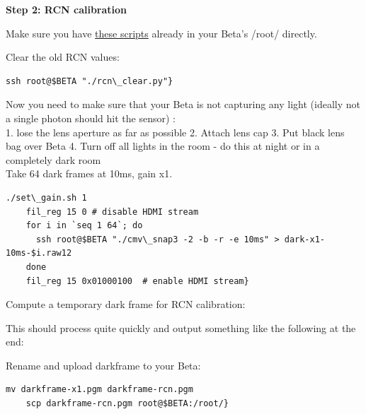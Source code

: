 {   


\textbf{Step 2: RCN calibration }

Make sure you have \href{https://github.com/apertus-open-source-cinema/beta-software/tree/master/beta-scripts}{these scripts} already in your Beta's /root/ directly.

Clear the old RCN values: 

\begin{lstlisting}[breaklines=true, breakatwhitespace=true]
ssh root@$BETA "./rcn\_clear.py"}
\end{lstlisting} 

Now you need to make sure that your Beta is not capturing any light (ideally not a single photon should hit the sensor) :\\

1. lose the lens aperture as far as possible
2. Attach lens cap
3. Put black lens bag over Beta
4. Turn off all lights in the room - do this at night or in a completely dark room \\

Take 64 dark frames at 10ms, gain x1. 

\begin{lstlisting}[breaklines=true, breakatwhitespace=true]
    ./set\_gain.sh 1
    fil_reg 15 0 # disable HDMI stream
    for i in `seq 1 64`; do
      ssh root@$BETA "./cmv\_snap3 -2 -b -r -e 10ms" > dark-x1-10ms-$i.raw12 
    done 
    fil_reg 15 0x01000100  # enable HDMI stream}
\end{lstlisting} 

Compute a temporary dark frame for RCN calibration: 


This should process quite quickly and output something like the following at the end: 

    
Rename and upload darkframe to your Beta:  

\begin{lstlisting}[breaklines=true, breakatwhitespace=true]
mv darkframe-x1.pgm darkframe-rcn.pgm
    scp darkframe-rcn.pgm root@$BETA:/root/}
\end{lstlisting} 

}
